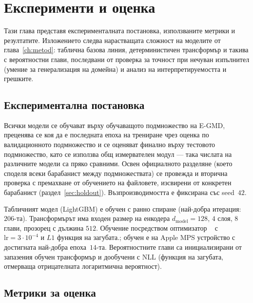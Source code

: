 \chapter{Експерименти и оценка}
\label{ch:eksperimenti}

Тази глава представя експерименталната постановка, използваните метрики и
резултатите. Изложението следва нарастващата сложност на моделите от
глава~\ref{ch:metod}: таблична базова линия, детерминистичен трансформър и
такива с вероятностни глави, последвани от проверка за точност
при нечуван изпълнител (умение за генерализация на домейна) и
анализ на интерпретируемостта и грешките.

\section{Експериментална постановка}
\label{sec:postanovka}

Всички модели се обучават върху обучаващото подмножество на E-GMD, преценява се
коя да е последната епоха на трениране чрез оценка по валидационното подмножество
и се оценяват финално върху тестовото подмножество, като
се използва общ измервателен модул — така числата на различните модели са пряко
сравними. Освен официалното разделяне (което споделя всеки барабанист между
подмножествата) се провежда и вторична проверка с премахване от обучението на файловете,
изсвирени от конкретен барабанист (раздел~\ref{sec:holdout}).
Възпроизводимостта е фиксирана със seed~$42$.

Табличният модел (LightGBM) е обучен с ранно спиране (най-добра итерация:~$206$-та).
Трансформърът има входен размер на енкодера $d_{\text{model}}=128$, $4$ слоя, $8$ глави, прозорец с
дължина $512$. Обучение посредством оптимизатор ~\cite{kingma2015adam}
с $\text{lr}=3\cdot10^{-4}$ и $L1$ функция на загубата.;
обучен е на Apple MPS устройство с достигната най-добра епоха~$14$-та.
Вероятностните глави са инициализирани от запазения обучен трансформър и дообучени с NLL
(функция на загубата, отмерваща отрицателната логаритмична вероятност).

\section{Метрики за оценка}
\label{sec:metriki}

